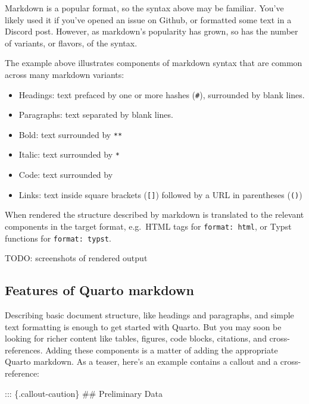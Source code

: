 \documentclass[
  letterpaper,
  DIV=11,
  numbers=noendperiod,
  oneside]{scrreprt}
\newenvironment{Shaded}{\begin{snugshade}}{\end{snugshade}}
\newcommand{\FunctionTok}[1]{\textcolor[rgb]{0.28,0.35,0.67}{#1}}
\newcommand{\NormalTok}[1]{\textcolor[rgb]{0.00,0.23,0.31}{#1}}
\begin{document}
\begin{tcolorbox}
\begin{codelisting}[H]
\end{codelisting}

Markdown is a popular format, so the syntax above may be familiar.
You've likely used it if you've opened an issue on Github, or formatted
some text in a Discord post. However, as markdown's popularity has
grown, so has the number of variants, or flavors, of the syntax.

The example above illustrates components of markdown syntax that are
common across many markdown variants:

\begin{itemize}
\item
  Headings: text prefaced by one or more hashes (\texttt{\#}),
  surrounded by blank lines.
\item
  Paragraphs: text separated by blank lines.
\item
  Bold: text surrounded by \texttt{**}
\item
  Italic: text surrounded by \texttt{*}
\item
  Code: text surrounded by \texttt{\textasciigrave{}}
\item
  Links: text inside square brackets (\texttt{{[}{]}}) followed by a URL
  in parentheses (\texttt{()})
\end{itemize}

When rendered the structure described by markdown is translated to the
relevant components in the target format, e.g.~HTML tags for
\texttt{format:\ html}, or Typst functions for \texttt{format:\ typst}.

TODO: screenshots of rendered output

\subsection{Features of Quarto
markdown}\label{features-of-quarto-markdown}

Describing basic document structure, like headings and paragraphs, and
simple text formatting is enough to get started with Quarto. But you may
soon be looking for richer content like tables, figures, code blocks,
citations, and cross-references. Adding these components is a matter of
adding the appropriate Quarto markdown. As a teaser, here's an example
contains a callout and a cross-reference:

\begin{codelisting}[H]

\caption{\texttt{document.qmd}}

\begin{Shaded}
\begin{Highlighting}[]
\NormalTok{::: \{.callout{-}caution\}}
\FunctionTok{\#\# Preliminary Data}


\end{Highlighting}
\end{Shaded}
\end{codelisting}
\end{tcolorbox}
\end{document}
